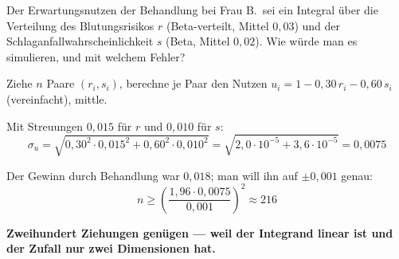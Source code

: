 \begin{aufgabe}
Der Erwartungsnutzen der Behandlung bei Frau B.\ sei ein Integral über die Verteilung des Blutungsrisikos $r$ (Beta-verteilt, Mittel $0{,}03$) und der Schlaganfallwahrscheinlichkeit $s$ (Beta, Mittel $0{,}02$). Wie würde man es simulieren, und mit welchem Fehler?

\loesung
{}
Ziehe $n$ Paare $(r_i, s_i)$, berechne je Paar den Nutzen $u_i = 1 - 0{,}30\,r_i - 0{,}60\,s_i$ (vereinfacht), mittle.

Mit Streuungen $0{,}015$ für $r$ und $0{,}010$ für $s$:
\[ \sigma_u = \sqrt{0{,}30^{2}\cdot0{,}015^{2} + 0{,}60^{2}\cdot0{,}010^{2}} = \sqrt{2{,}0\cdot10^{-5}+3{,}6\cdot10^{-5}} = 0{,}0075 \]

Der Gewinn durch Behandlung war $0{,}018$; man will ihn auf $\pm0{,}001$ genau:
\[ n \ge \left(\frac{1{,}96\cdot0{,}0075}{0{,}001}\right)^{2} \approx 216 \]

\begin{center}
\begin{minipage}{0.9\textwidth}
\textbf{Zweihundert Ziehungen genügen --- weil der Integrand linear ist und der Zufall nur zwei Dimensionen hat.}
\end{minipage}
\end{center}

\begin{center}
\begin{minipage}{0.88\textwidth}
\end{minipage}
\end{center}
\end{aufgabe}

